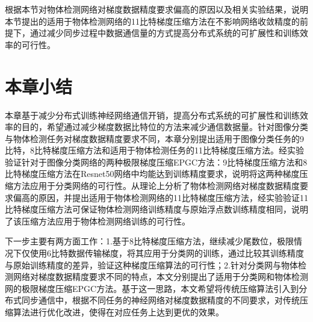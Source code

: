 根据本节对物体检测网络对梯度数据精度要求偏高的原因以及相关实验结果，说明本节提出的适用于物体检测网络的11比特梯度压缩方法在不影响网络收敛精度的前提下，通过减少同步过程中数据通信量的方式提高分布式系统的可扩展性和训练效率的可行性。

\section{本章小结}

本章基于减少分布式训练神经网络通信开销，提高分布式系统的可扩展性和训练效率的目的，希望通过减少梯度数据比特位的方法来减少通信数据量。针对图像分类与物体检测任务对梯度数据精度要求不同，本章分别提出适用于图像分类任务的9比特，8比特梯度压缩方法和适用于物体检测任务的11比特梯度压缩方法。经实验验证针对于图像分类网络的两种极限梯度压缩EPGC方法：9比特梯度压缩方法和8比特梯度压缩方法在Resnet50网络中均能达到训练精度要求，说明将这两种梯度压缩方法应用于分类网络的可行性。从理论上分析了物体检测网络对梯度数据精度要求偏高的原因，并提出适用于物体检测网络的11比特梯度压缩方法，经实验验证11比特梯度压缩方法可保证物体检测网络训练精度与原始浮点数训练精度相同，说明了该压缩方法应用于物体检测网络训练的可行性。

下一步主要有两方面工作：1.基于8比特梯度压缩方法，继续减少尾数位，极限情况下仅使用6比特数据传输梯度，将其应用于分类网的训练，通过比较其训练精度与原始训练精度的差异，验证这种梯度压缩算法的可行性；2.针对分类网与物体检测网络对梯度数据精度要求不同的特点，本文分别提出了适用于分类网和物体检测网的极限梯度压缩EPGC方法。基于这一思路，本文希望将传统压缩算法引入到分布式同步通信中，根据不同任务的神经网络对梯度数据精度的不同要求，对传统压缩算法进行优化改进，使得在对应任务上达到更优的效果。



